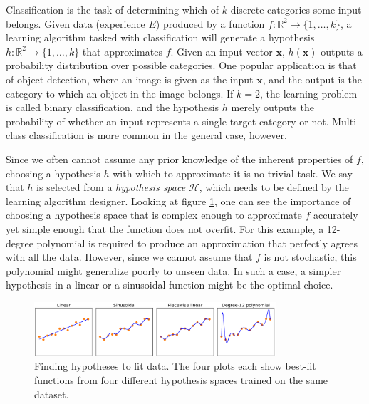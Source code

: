 Classification is the task of determining which of $k$ discrete categories some input belongs. Given data (experience $E$) produced by a function $f:\mathbb{R}^{2}\to\{1,\dots,k\}$, a learning algorithm tasked with classification will generate a hypothesis $h:\mathbb{R}^{2}\to\{1,\dots,k\}$ that approximates $f$. Given an input vector $\bm{x}$, $h(\bm{x})$ outputs a probability distribution over possible categories. One popular application is that of object detection, where an image is given as the input $\bm{x}$, and the output is the category to which an object in the image belongs. If $k=2$, the learning problem is called binary classification, and the hypothesis $h$ merely outputs the probability of whether an input represents a single target category or not. Multi-class classification is more common in the general case, however. 


Since we often cannot assume any prior knowledge of the inherent properties of $f$, choosing a hypothesis $h$ with which to approximate it is no trivial task. We say that $h$ is selected from a \textit{hypothesis space} $\mathcal{H}$, which needs to be defined by the learning algorithm designer. Looking at figure \ref{fig:bt_hypotheses}, one can see the importance of choosing a hypothesis space that is complex enough to approximate $f$ accurately yet simple enough that the function does not overfit. For this example, a 12-degree polynomial is required to produce an approximation that perfectly agrees with all the data. However, since we cannot assume that $f$ is not stochastic, this polynomial might generalize poorly to unseen data. In such a case, a simpler hypothesis in a linear or a sinusoidal function might be the optimal choice.

\begin{figure}[h]
    \centering
    \includegraphics[width=0.8\textwidth]{figures/bt_hypotheses.png}
    \caption{Finding hypotheses to fit data. The four plots each show best-fit functions from four different hypothesis spaces trained on the same dataset.}
    \label{fig:bt_hypotheses}
\end{figure}

